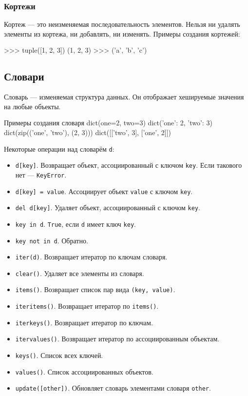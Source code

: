 \subsubsection{Кортежи}
Кортеж --- это неизменяемая последовательность элементов. Нельзя ни удалять элементы из кортежа, ни добавлять, ни изменять. Примеры создания кортежей:
\begin{pylst}{}{}
>>> tuple([1, 2, 3])
(1, 2, 3)
>>> ('a', 'b', 'c')
\end{pylst}

\subsection{Словари}
Словарь --- изменяемая структура данных. Он отображает хешируемые значения на любые объекты.
\begin{pylst}{Примеры создания словаря}{}
dict(one=2, two=3)
dict({'one': 2, 'two': 3})
dict(zip(('one', 'two'), (2, 3)))
dict([['two', 3], ['one', 2]])
\end{pylst}

Некоторые операции над словарём \texttt{d}:
\begin{itemize}
  \item \lstinline{d[key]}. Возвращает объект, ассоциированный с ключом \lstinline{key}. Если такового нет --- \lstinline{KeyError}.
  \item \lstinline{d[key] = value}. Ассоциирует объект \lstinline{value} с ключом \lstinline{key}.
  \item \lstinline{del d[key]}. Удаляет объект, ассоциированный с ключом \lstinline{key}.
  \item \lstinline{key in d}. \lstinline{True}, если \lstinline{d} имеет ключ \lstinline{key}.
  \item \lstinline{key not in d}. Обратно.
  \item \lstinline{iter(d)}. Возвращает итератор по ключам словаря.
  \item \lstinline{clear()}. Удаляет все элементы из словаря.
  \item \lstinline{items()}. Возвращает список пар вида \lstinline{(key, value)}.
  \item \lstinline{iteritems()}. Возвращает итератор по \lstinline{items()}.
  \item \lstinline{iterkeys()}. Возвращает итератор по ключам.
  \item \lstinline{itervalues()}. Возвращает итератор по ассоциированным объектам.
  \item \lstinline{keys()}. Список всех ключей.
  \item \lstinline{values()}. Список ассоциированных объектов.
  \item \lstinline{update([other])}. Обновляет словарь элементами словаря \lstinline{other}.
\end{itemize}

